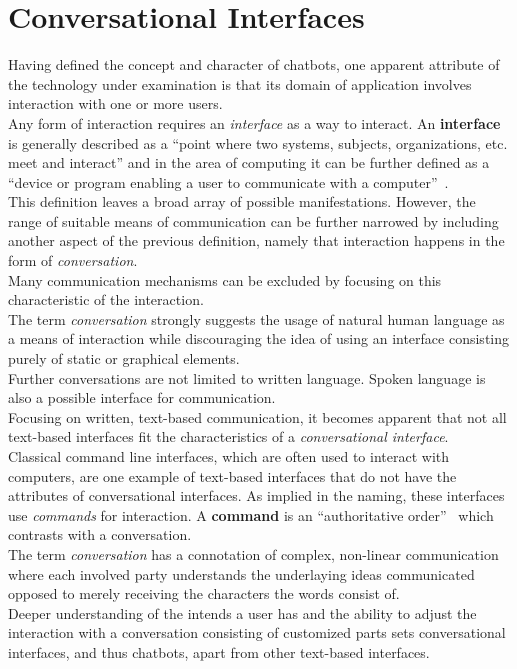 \section{Conversational Interfaces}


Having defined the concept and character of chatbots, one apparent attribute of the technology under examination is that its domain of application involves interaction with one or more users.
\\

Any form of interaction requires an \emph{interface} as a way to interact.
An \textbf{interface} is generally described as a ``point where two systems, subjects, organizations, etc. meet and interact'' and in the area of computing it can be further defined as a ``device or program enabling a user to communicate with a computer''~\cite{oxfordinterface}.
\\

This definition leaves a broad array of possible manifestations.
However, the range of suitable means of communication can be further narrowed by including another aspect of the previous definition, namely that interaction happens in the form of \emph{conversation}.
\\

Many communication mechanisms can be excluded by focusing on this characteristic of the interaction.
\\
The term \emph{conversation} strongly suggests the usage of natural human language as a means of interaction
while discouraging the idea of using an interface consisting purely of static or graphical elements.
\\
Further conversations are not limited to written language.
Spoken language is also a possible interface for communication.
\\

Focusing on written, text-based communication, it becomes apparent that not all text-based interfaces fit the characteristics of a \emph{conversational interface}.
\\
Classical command line interfaces, which are often used to interact with computers, are one example of text-based interfaces that do not have the attributes of conversational interfaces.
As implied in the naming, these interfaces use \emph{commands} for interaction. A \textbf{command} is an ``authoritative order''~\cite{oxfordcommand} which contrasts with a conversation.
\\
The term \emph{conversation} has a connotation of complex, non-linear communication where each involved party understands the underlaying ideas communicated opposed to merely receiving the characters the words consist of.
\\

Deeper understanding of the intends a user has and the ability to adjust the interaction with a conversation consisting of customized parts sets conversational interfaces, and thus chatbots, apart from other text-based interfaces.
